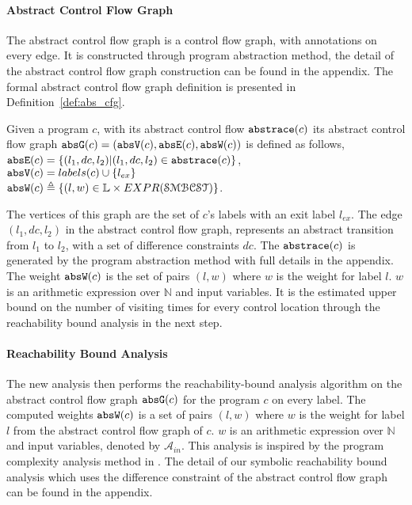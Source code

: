 \paragraph*{Abstract Control Flow Graph}
The abstract control flow graph is a control flow graph, with annotations on every edge. 
It is constructed through program abstraction method,
the detail of the abstract control flow graph construction can be found in the appendix.
The formal abstract control flow graph definition is presented in
Definition~\ref{def:abs_cfg}.
\begin{defn}
\label{def:abs_cfg}
Given a program $c$, 
with its abstract control flow $\mathtt{abs}{\mathtt{trace}}(c)$
its abstract control flow graph $\mathtt{abs}{\mathtt{G}}(c) =(\mathtt{abs}{\mathtt{V}}(c), \mathtt{abs}{\mathtt{E}}(c), \mathtt{abs}{\mathtt{W}}(c))$ is defined as follows,
\\
%
$\mathtt{abs}{\mathtt{E}}(c) = \{(l_1, dc, l_2) | (l_1, dc, l_2) \in \mathtt{abs}{\mathtt{trace}}(c)\}$,
\\
$\mathtt{abs}{\mathtt{V}}(c) = labels(c)\cup\{l_{ex}\}$
\\
 $\absW(c) 
\triangleq \left\{ (l, w) \in \mathbb{L} \times EXPR(\constdom) \right\}$.
\end{defn}
%
The vertices of this graph are the set of $c$'s labels with an exit label $l_{ex}$.
The edge $(l_1, dc, l_2)$ in the abstract control flow graph, represents an abstract transition 
from $l_1$ to $l_2$, with a set of difference constraints $dc$. The $\mathtt{abs}{\mathtt{trace}}(c)$ is generated by the
program abstraction method with full details in the appendix.
The weight $\mathtt{abs}{\mathtt{W}}(c)$ is the set of pairs $(l,w)$ where $w$ is the weight for label $l$. 
$w$ is an arithmetic expression over $\mathbb{N}$ and input variables.
It is the estimated upper bound on the number of visiting times for every control location
through the reachability bound analysis in the next step.

\paragraph{Reachability Bound Analysis}
The new analysis then performs the reachability-bound analysis algorithm on the abstract control flow graph $\mathtt{abs}{\mathtt{G}}(c)$ for the program
$c$ on every label.
The computed weights $\mathtt{abs}{\mathtt{W}}(c)$ is
a set of pairs 
$(l, w)$ where 
$w$ is the weight 
for label $l$ from the abstract control flow graph of $c$.
$w$ is an arithmetic expression over $\mathbb{N}$ and
input variables, denoted by $\mathcal{A}_{in}$.
This analysis is inspired by the program complexity analysis method in \cite{sinn2017complexity}.
The detail of our symbolic reachability bound analysis which uses the difference constraint of the abstract control flow graph can be found in the appendix.

